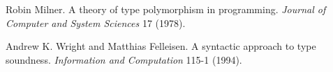 \begin{thebibliography}{99}

Robin Milner.
A theory of type polymorphism in programming.
\emph{Journal of Computer and System Sciences} 17 (1978).

Andrew K. Wright and Matthias Felleisen.
A syntactic approach to type soundness.
\emph{Information and Computation} 115-1 (1994).
\end{thebibliography}
